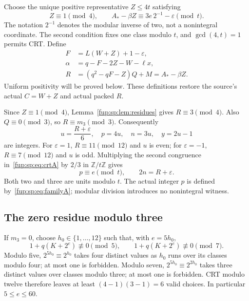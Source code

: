 \documentclass[11pt,letterpaper]{article}
\theoremstyle{definition}\newtheorem{definition}[theorem]{Definition}
\theoremstyle{remark}\newtheorem{remark}[theorem]{Remark}
\begin{document}
Choose the unique positive representative $Z\le4t$ satisfying
\begin{equation}
Z\equiv1\pmod4,\qquad
A_*-\beta Z\equiv3e\,2^{-1}-\varepsilon\pmod t.
\label{fup:sp:eq:crtA}
\end{equation}
The notation $2^{-1}$ denotes the modular inverse of two, not a
nonintegral coordinate. The second condition fixes one class modulo
$t$, and $\gcd(4,t)=1$ permits CRT. Define
\begin{align}
F&=L(W+Z)+1-\varepsilon,\label{fup:sp:eq:F}\\
\alpha&=q-F-2Z-W-\ell x,\label{fup:sp:eq:alpha}\\
R&=(q^2-qF-Z)Q+M=A_*-\beta Z.\label{fup:sp:eq:affineR}
\end{align}
Uniform positivity will be proved below. These definitions restore
the source's actual $C=W+Z$ and actual packed $R$.

Since $Z\equiv1\pmod4$, Lemma~\ref{fup:sp:lem:residues} gives
$R\equiv3\pmod4$. Also $Q\equiv0\pmod3$, so $R\equiv m_3\pmod3$.
Consequently
\begin{equation}
u=\frac{R+\varepsilon}{6},\quad
p=4u,\quad n=3u,\quad y=2u-1
\label{fup:sp:eq:familyA}
\end{equation}
are integers. For $\varepsilon=1$, $R\equiv11\pmod{12}$ and $u$ is
even; for $\varepsilon=-1$, $R\equiv7\pmod{12}$ and $u$ is odd.
Multiplying the second congruence in~\eqref{fup:sp:eq:crtA} by $2/3$
in $\mathbb Z/t\mathbb Z$ gives
\begin{equation}
p\equiv e\pmod t,\qquad 2n=R+\varepsilon.
\label{fup:sp:eq:coupleA}
\end{equation}
Both two and three are units modulo $t$. The actual integer $p$
is defined by~\eqref{fup:sp:eq:familyA}; modular division introduces no
nonintegral witness.

\subsection{The zero residue modulo three}
\label{fup:sp:sec:branchB}
If $m_3=0$, choose $h_0\in\{1,\ldots,12\}$ such that, with $e=5h_0$,
\begin{equation}
1+q(K+2^e)\not\equiv0\pmod5,\qquad
1+q(K+2^e)\not\equiv0\pmod7.
\label{fup:sp:eq:eB}
\end{equation}
Modulo five, $2^{5h_0}\equiv2^{h_0}$ takes four distinct values as
$h_0$ runs over its classes modulo four; at most one is forbidden.
Modulo seven, $2^{5h_0}\equiv2^{2h_0}$ takes three distinct values
over classes modulo three; at most one is forbidden. CRT modulo
twelve therefore leaves at least $(4-1)(3-1)=6$ valid choices.
In particular $5\le e\le60$.
\end{document}
